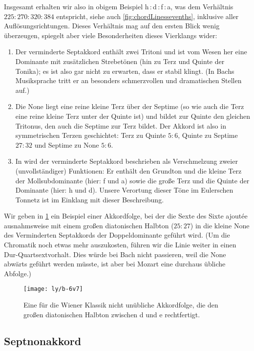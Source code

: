 Insgesamt erhalten wir also in obigem Beispiel \naturalm
h\,:\,d\,:\,f\,:\,\flatp a, was dem Verhältnis $225:270:320:384$ entspricht,
siehe auch \cref{fig:chordLinessevenths}, inklusive aller Auflösungsrichtungen.
Dieses Verhältnis mag auf den ersten Blick wenig überzeugen, spiegelt aber viele
Besonderheiten dieses Vierklangs wider:
\begin{enumerate}
\item Der verminderte Septakkord enthält zwei Tritoni und ist vom Wesen her eine
  Dominante mit zusätzlichen Strebetönen (hin zu Terz und Quinte der Tonika); es
  ist also gar nicht zu erwarten, dass er stabil klingt.  (In Bachs Musiksprache
  tritt er an besonders schmerzvollen und dramatischen Stellen auf.)
\item Die None liegt eine reine kleine Terz über der Septime (so wie auch die
  Terz eine reine kleine Terz unter der Quinte ist) und bildet zur Quinte den
  gleichen Tritonus, den auch die Septime zur Terz bildet.  Der Akkord ist also
  in symmetrischen Terzen geschichtet: Terz zu Quinte $5:6$, Quinte zu Septime
  $27:32$ und Septime zu None $5:6$.
\item In \cite[S.\,92ff.]{deLaMotte} wird der verminderte Septakkord beschrieben
  als Verschmelzung zweier (unvollständiger) Funktionen: Er enthält den Grundton
  und die kleine Terz der Mollsubdominante (hier: f und \flat a) sowie die große
  Terz und die Quinte der Dominante (hier: h und d).  Unsere Verortung dieser
  Töne im Eulerschen Tonnetz ist im Einklang mit dieser Beschreibung.
\end{enumerate}
Wir geben in \cref{fig:6v7} ein Beispiel einer Akkordfolge, bei der die Sexte
des Sixte ajoutée ausnahmsweise mit einem großen diatonischen Halbton ($25:27$)
in die kleine None des Verminderten Septakkords der Doppeldominante geführt
wird. (Um die Chromatik noch etwas mehr auszukosten, führen wir die Linie weiter
in einen Dur-Quartsextvorhalt.  Dies würde bei Bach nicht passieren, weil die
None abwärts geführt werden müsste, ist aber bei Mozart eine durchaus übliche
Abfolge.)

\begin{figure}
  \centering
  \texttt{[image: ly/b-6v7]}
  \caption{Eine für die Wiener Klassik nicht unübliche Akkordfolge, die den
    großen diatonischen Halbton zwischen \naturalm d und \flatp e rechtfertigt.}\label{fig:6v7}
\end{figure}

\subsection{Septnonakkord}
\label{sec:dom79syn}

